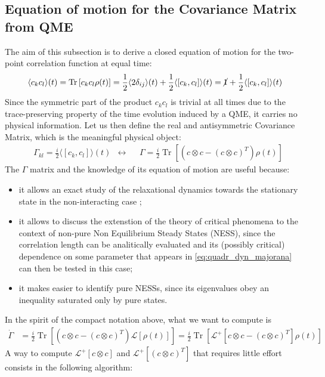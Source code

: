 \documentclass[a4paper,11pt]{article}
\DeclareMathOperator{\Tr}{Tr}
\newcommand{\mean}[1]{\ensuremath{\langle #1 \rangle}}
\newcommand{\ro}{\rho}
\newcommand{\nl}{\vskip 0.3cm}
\begin{document}
  \subsection{Equation of motion for the Covariance Matrix from QME}
  The aim of this subsection is to derive a closed equation of motion for the two-point correlation function at equal time: \begin{equation*}
  \mean{c_kc_l}(t)=\Tr\left[c_kc_l\ro(t)\right]=\frac{1}{2}\mean{2\delta_{ij}}(t)+\frac{1}{2}\mean{[c_k,c_l]}(t)=\cancel{1}+\frac{1}{2}\mean{[c_k,c_l]}(t)
  \end{equation*}
  Since the symmetric part of the product $c_kc_l$ is trivial at all times due to the trace-preserving property of the time evolution induced by a QME, it carries no physical information. Let us then define the real and antisymmetric Covariance Matrix, which is the meaningful physical object:
  \begin{align}
   &\Gamma_{kl}=\frac{i}{2}\mean{\left[c_k,c_l\right]}(t) &  \longleftrightarrow & & \Gamma = \frac{i}{2}\Tr\left[\left(c\otimes c - (c\otimes c)^T\right)\ro(t)\right]
   \label{eq:def_covariance}
  \end{align}
  The $\Gamma$ matrix and the knowledge of its equation of motion are useful because:
  \begin{itemize}
   \item it allows an exact study of the relaxational dynamics towards the stationary state in the non-interacting case \cite{Eisert2010};
   \item it allows to discuss the extenstion of the theory of critical phenomena to the context of non-pure Non Equilibrium Steady States (NESS), since the correlation length can be analitically evaluated and its (possibly critical) dependence on some parameter that appears in \ref{eq:quadr_dyn_majorana} can then be tested in this case;
   \item it makes easier to identify pure NESSs, since its eigenvalues obey an inequality saturated only by pure states.\nl
  \end{itemize}
  In the spirit of the compact notation above, what we want to compute is
  \begin{align*}
   \dot{\Gamma} &=  \frac{i}{2}\Tr\left[\left(c\otimes c - (c\otimes c)^T\right)\mathcal{L}\left[\ro(t)\right]\right]=  \frac{i}{2}\Tr\left[\mathcal{L}^+\!\!\left[c\otimes c - (c\otimes c)^T\right]\ro(t)\right]
  \end{align*}
  A way to compute  $\mathcal{L}^+\!\!\left[c\otimes c\right]$ and $\mathcal{L}^+\!\!\left[ (c\otimes c)^T\right]$ that requires little effort consists in the following algorithm:
\end{document}

